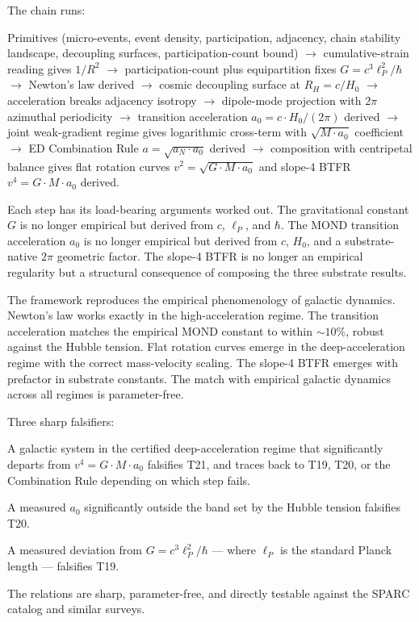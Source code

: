 \documentclass[11pt,a4paper]{article}
\begin{document}
The chain runs:

Primitives (micro-events, event density, participation, adjacency, chain stability landscape, decoupling surfaces, participation-count bound) $\to$ cumulative-strain reading gives $1/R^2$ $\to$ participation-count plus equipartition fixes $G = c^3\ell_P^2/\hbar$ $\to$ Newton's law derived $\to$ cosmic decoupling surface at $R_H = c/H_0$ $\to$ acceleration breaks adjacency isotropy $\to$ dipole-mode projection with $2\pi$ azimuthal periodicity $\to$ transition acceleration $a_0 = c\cdot H_0/(2\pi)$ derived $\to$ joint weak-gradient regime gives logarithmic cross-term with $\sqrt{M\cdot a_0}$ coefficient $\to$ ED Combination Rule $a = \sqrt{a_N\cdot a_0}$ derived $\to$ composition with centripetal balance gives flat rotation curves $v^2 = \sqrt{G\cdot M\cdot a_0}$ and slope-4 BTFR $v^4 = G\cdot M\cdot a_0$ derived.

Each step has its load-bearing arguments worked out. The gravitational constant $G$ is no longer empirical but derived from $c$, $\ell_P$, and $\hbar$. The MOND transition acceleration $a_0$ is no longer empirical but derived from $c$, $H_0$, and a substrate-native $2\pi$ geometric factor. The slope-4 BTFR is no longer an empirical regularity but a structural consequence of composing the three substrate results.

The framework reproduces the empirical phenomenology of galactic dynamics. Newton's law works exactly in the high-acceleration regime. The transition acceleration matches the empirical MOND constant to within $\sim 10\%$, robust against the Hubble tension. Flat rotation curves emerge in the deep-acceleration regime with the correct mass-velocity scaling. The slope-4 BTFR emerges with prefactor in substrate constants. The match with empirical galactic dynamics across all regimes is parameter-free.

Three sharp falsifiers:

A galactic system in the certified deep-acceleration regime that significantly departs from $v^4 = G\cdot M\cdot a_0$ falsifies T21, and traces back to T19, T20, or the Combination Rule depending on which step fails.

A measured $a_0$ significantly outside the band set by the Hubble tension falsifies T20.

A measured deviation from $G = c^3\ell_P^2/\hbar$ --- where $\ell_P$ is the standard Planck length --- falsifies T19.

The relations are sharp, parameter-free, and directly testable against the SPARC catalog and similar surveys.
\end{document}
